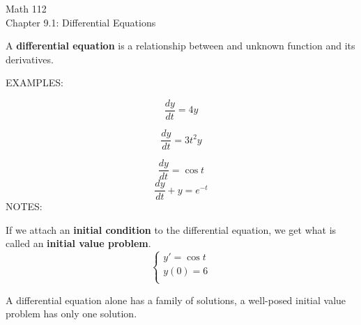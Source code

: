 \documentclass[11pt]{article}
\begin{document}
\begin{center}
\Large
\rm{Math 112}
\\
\rm{Chapter 9.1:  Differential Equations}\\

\end{center}
\vspace{0.2in}

\vspace{0.2in}

A {\bf differential equation} is a relationship between and unknown function and its derivatives.

\vspace{0.2in}

EXAMPLES:

\begin{displaymath}
  \frac{dy}{dt} = 4y
\end{displaymath}
\vspace{0.8in}

\begin{displaymath}
  \frac{dy}{dt} = 3t^2y
\end{displaymath}
\vspace{0.8in}

\begin{displaymath}
  \frac{dy}{dt} = \cos{t}
\end{displaymath}
\vspace{0.8in}
\begin{displaymath}
  \frac{dy}{dt} + y = e^{-t}
\end{displaymath}
\vspace{0.8in}
NOTES:

\pagebreak

If we attach an {\bf initial condition} to the differential equation, we get what is called an {\bf initial value problem}.\\

\begin{displaymath}
  \left\{ \begin{array}{ll}
  y' = \cos{t} \\
y(0) = 6 \\
\end{array} \right.
\end{displaymath}

\vspace{0.2in}

A differential equation alone has a family of solutions, a well-posed initial value problem has only one solution.\\
\end{document}
